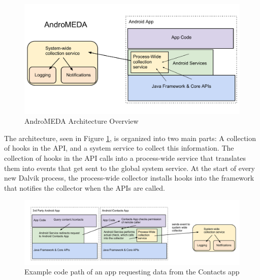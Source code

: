 
\begin{figure}[t]
\begin{center}
\includegraphics[width=0.9\columnwidth]{figs/AndroMEDA-Architecture-Overview}
\caption{AndroMEDA Architecture Overview}
\label{fig:andromedaoverview}
\end{center}
\end{figure}

The architecture, seen in Figure \ref{fig:andromedaoverview}, is organized into two main parts: A collection of hooks in the API, and a system service to collect this information. The collection of hooks in the API calls into a process-wide service that translates them into events that get sent to the global system service. At the start of every new Dalvik process, the process-wide collector installs hooks into the framework that notifies the collector when the APIs are called.

\begin{figure}[t]
\begin{center}
\includegraphics[width=0.9\columnwidth]{figs/AndroMEDA-Inter-App-Example}
\caption{Example code path of an app requesting data from the Contacts app}
\label{fig:interapp-example}
\end{center}
\end{figure}

